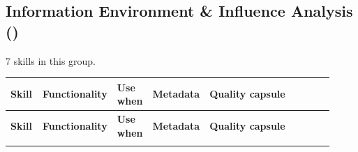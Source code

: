 \documentclass[
]{article}
\renewcommand{\arraystretch}{1.08}
\begin{document}
\subsection{\texorpdfstring{Information Environment \& Influence
Analysis
()}{Information Environment & Influence Analysis (information_environment)}}\label{information-environment-influence-analysis-information_environment}

7 skills in this group.

\begingroup
\scriptsize
\setlength{\tabcolsep}{1.8pt}
\renewcommand{\arraystretch}{1.02}
\begin{longtable}{@{}>{\raggedright\arraybackslash}p{0.105\linewidth}>{\raggedright\arraybackslash}p{0.13\linewidth}>{\raggedright\arraybackslash}p{0.095\linewidth}>{\raggedright\arraybackslash}p{0.135\linewidth}>{\raggedright\arraybackslash}p{0.455\linewidth}@{}}
\toprule
\textbf{Skill} & \textbf{Functionality} & \textbf{Use when} & \textbf{Metadata} & \textbf{Quality capsule}\\
\midrule
\endfirsthead
\toprule
\textbf{Skill} & \textbf{Functionality} & \textbf{Use when} & \textbf{Metadata} & \textbf{Quality capsule}\\
\midrule
\endhead
\bottomrule
\endfoot

\end{longtable}
\end{document}
